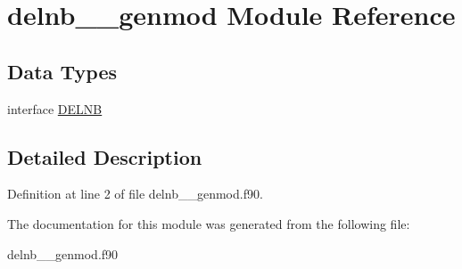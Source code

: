\hypertarget{classdelnb____genmod}{\section{delnb\+\_\+\+\_\+genmod Module Reference}
\label{classdelnb____genmod}
}
\subsection*{Data Types}
\begin{DoxyCompactItemize}
\item 
interface \hyperlink{interfacedelnb____genmod_1_1_d_e_l_n_b}{D\+E\+L\+N\+B}
\end{DoxyCompactItemize}


\subsection{Detailed Description}


Definition at line 2 of file delnb\+\_\+\+\_\+genmod.\+f90.



The documentation for this module was generated from the following file\+:\begin{DoxyCompactItemize}
\item 
delnb\+\_\+\+\_\+genmod.\+f90\end{DoxyCompactItemize}
